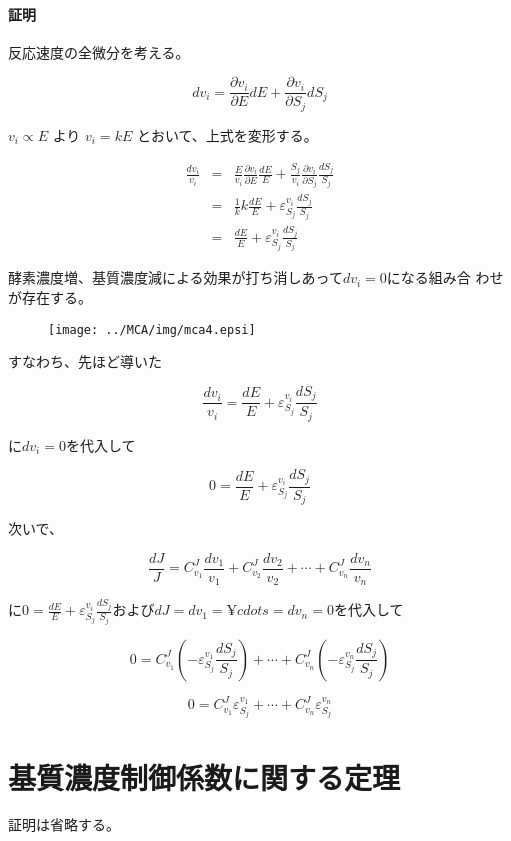 \paragraph{証明}
反応速度の全微分を考える。

\[dv_i = \frac{\partial v_i}{\partial E} dE + \frac{\partial v_i}{\partial S_j} dS_j\]

\(v_i \propto E\) より \(v_i = k E\) とおいて、上式を変形する。

\begin{eqnarray*}
\frac{dv_i}{v_i} & = &\frac{E}{v_i}\frac{\partial v_i}{\partial E}\frac{dE}{E} + \frac{S_j}{v_i}\frac{\partial v_i}{\partial S_j} \frac{dS_j}{S_j}\\
& = & \frac{1}{k} k \frac{dE}{E} + \varepsilon^{v_i}_{S_j} \frac{dS_j}{S_j}\\
& = & \frac{dE}{E} + \varepsilon^{v_i}_{S_j}\frac{dS_j}{S_j}
\end{eqnarray*}

酵素濃度増、基質濃度減による効果が打ち消しあって\(dv_i=0\)になる組み合
わせが存在する。

\begin{figure}[h]
\begin{center}
\texttt{[image: ../MCA/img/mca4.epsi]}
\end{center}
\end{figure}

すなわち、先ほど導いた

\[\frac{dv_i}{v_i} = \frac{dE}{E} + \varepsilon^{v_i}_{S_j}\frac{dS_j}{S_j}\]

に\(dv_i=0\)を代入して

\[0  = \frac{dE}{E} + \varepsilon^{v_i}_{S_j}\frac{dS_j}{S_j}\]

次いで、

\[\frac{dJ} {J}   =  C^J_{v_1}\frac{dv_1}{v_1} + C^J_{v_2}\frac{dv_2}{v_2} + \cdots + C^J_{v_n}\frac{dv_n}{v_n}\]

に\(0  = \frac{dE}{E} + \varepsilon^{v_i}_{S_j}\frac{dS_j}{S_j}\)および\(dJ = dv_1 = ¥cdots = dv_n = 0\)を代入して

\[0 = C^J_{v_1} \left( -\varepsilon^{v_1}_{S_j} \frac{dS_j}{S_j}\right)+\cdots+C^J_{v_n} \left( -\varepsilon^{v_n}_{S_j} \frac{dS_j}{S_j}\right) \]

\[0 = C^J_{v_1} \varepsilon^{v_1}_{S_j} +\cdots+C^J_{v_n} \varepsilon^{v_n}_{S_j}\]

\section{基質濃度制御係数に関する定理}
証明は省略する。
